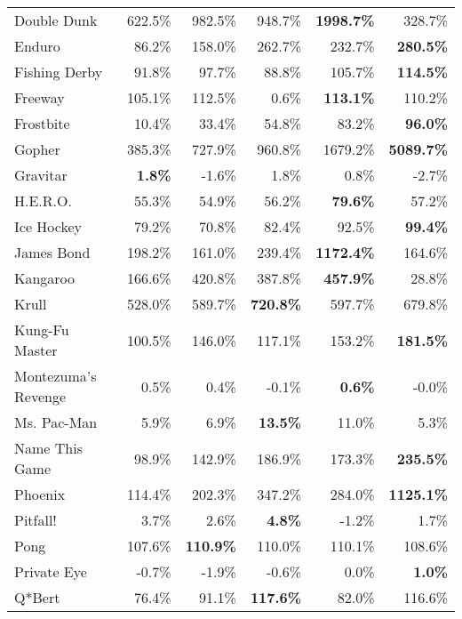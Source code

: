 \begin{table}[t]
\begin{center}
\begin{tabular}{l|rrr|rr}
         Double Dunk &   622.5\% &   982.5\% &   948.7\% &{\bf1998.7\%}&     328.7\% \\
              Enduro &    86.2\% &   158.0\% &   262.7\% &   232.7\% &{\bf280.5\%}\\
       Fishing Derby &    91.8\% &    97.7\% &    88.8\% &   105.7\% &{\bf114.5\%}\\
             Freeway &   105.1\% &   112.5\% &     0.6\% &{\bf113.1\%}&     110.2\% \\
           Frostbite &    10.4\% &    33.4\% &    54.8\% &    83.2\% &{\bf96.0\%}\\
              Gopher &   385.3\% &   727.9\% &   960.8\% &  1679.2\% &{\bf5089.7\%}\\
            Gravitar &{\bf1.8\%}&    -1.6\% &     1.8\% &     0.8\% &      -2.7\% \\
            H.E.R.O. &    55.3\% &    54.9\% &    56.2\% &{\bf79.6\%}&      57.2\% \\
          Ice Hockey &    79.2\% &    70.8\% &    82.4\% &    92.5\% &{\bf99.4\%}\\
          James Bond &   198.2\% &   161.0\% &   239.4\% &{\bf1172.4\%}&     164.6\% \\
            Kangaroo &   166.6\% &   420.8\% &   387.8\% &{\bf457.9\%}&      28.8\% \\
               Krull &   528.0\% &   589.7\% &{\bf720.8\%}&   597.7\% &     679.8\% \\
      Kung-Fu Master &   100.5\% &   146.0\% &   117.1\% &   153.2\% &{\bf181.5\%}\\
 Montezuma's Revenge &     0.5\% &     0.4\% &    -0.1\% &{\bf0.6\%}&      -0.0\% \\
         Ms. Pac-Man &     5.9\% &     6.9\% &{\bf13.5\%}&    11.0\% &       5.3\% \\
      Name This Game &    98.9\% &   142.9\% &   186.9\% &   173.3\% &{\bf235.5\%}\\
             Phoenix &   114.4\% &   202.3\% &   347.2\% &   284.0\% &{\bf1125.1\%}\\
            Pitfall! &     3.7\% &     2.6\% &{\bf4.8\%}&    -1.2\% &       1.7\% \\
                Pong &   107.6\% &{\bf110.9\%}&   110.0\% &   110.1\% &     108.6\% \\
         Private Eye &    -0.7\% &    -1.9\% &    -0.6\% &     0.0\% &{\bf1.0\%}\\
              Q*Bert &    76.4\% &    91.1\% &{\bf117.6\%}&    82.0\% &     116.6\% \\

\end{tabular}
\end{center}
\end{table}

